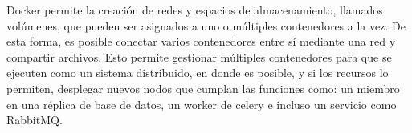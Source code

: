 Docker permite la creación de redes y espacios de almacenamiento, llamados volúmenes, que pueden ser asignados a uno o múltiples contenedores a la vez.
De esta forma, es posible conectar varios contenedores entre sí mediante una red y compartir archivos.
Esto permite gestionar múltiples contenedores para que se ejecuten como un sistema distribuido,
en donde es posible, y si los recursos lo permiten, desplegar nuevos nodos que cumplan las funciones como:
un miembro en una réplica de base de datos, un worker de celery e incluso un servicio como RabbitMQ.
